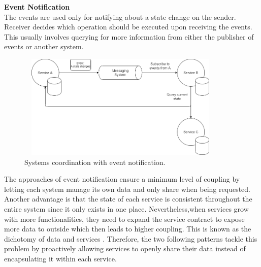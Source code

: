 \textbf{Event Notification}\\
The events are used only for notifying about a state change on the sender. Receiver decides which operation should be executed upon receiving the events. This usually involves querying for more information from either the publisher of events or another system.   
\begin{figure}[h]
	\centering
	\includegraphics[width=10cm,height=5cm]{images/eventnotification.png}
	\caption{Systems coordination with event notification.}
	\label{fig:eventnotification}
\end{figure}

The approaches of event notification ensure a minimum level of coupling by letting each system manage its own data and only share when being requested. Another advantage is that the state of each service is consistent throughout the entire system since it only exists in one place. Nevertheless,when services grow with more functionalities, they need to expand the service contract to expose more data to outside which then leads to higher coupling. This is known as the dichotomy of data and services \cite{stopford2018designing}. Therefore, the two following patterns tackle this problem by proactively allowing services to openly share their data instead of encapsulating it within each service.

